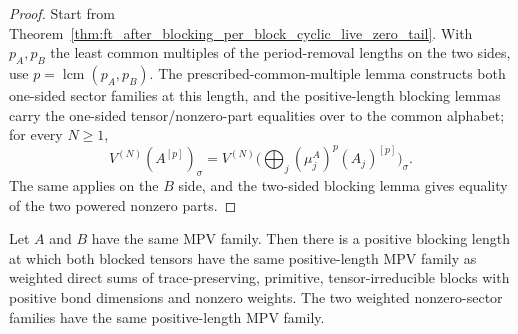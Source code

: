 \begin{proof}\leanok
    Start from
    Theorem~\ref{thm:ft_after_blocking_per_block_cyclic_live_zero_tail}. With
    $p_A,p_B$ the least common multiples of the period-removal lengths on the two
    sides, use $p=\operatorname{lcm}(p_A,p_B)$. The prescribed-common-multiple
    lemma constructs both one-sided sector families at this length, and the
    positive-length blocking lemmas carry the one-sided tensor/nonzero-part
    equalities over to the common alphabet; for every $N\ge 1$,
    \[
        V^{(N)}\!(A^{[p]})_\sigma
        =
        V^{(N)}\!\bigl(\textstyle\bigoplus_j
        (\mu^A_j)^p (A_j)^{[p]}\bigr)_\sigma.
    \]
    The same applies on the $B$ side, and the two-sided blocking lemma gives
    equality of the two powered nonzero parts.
\end{proof}

\begin{theorem}%
    \label{thm:unconditional_common_primitive_irreducible_blocks}
    \leanok
    Let $A$ and $B$ have the same MPV family. Then there is a positive blocking
    length at which both blocked tensors have the same positive-length MPV
    family as weighted direct sums of trace-preserving, primitive,
    tensor-irreducible blocks with positive bond dimensions and nonzero weights.
    The two weighted nonzero-sector families have the same positive-length MPV
    family.
\end{theorem}

